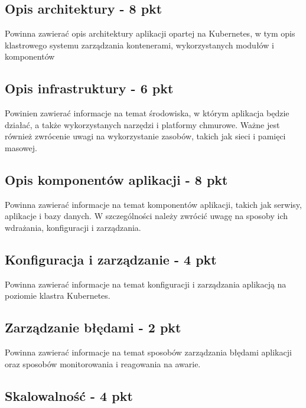 \documentclass[12pt,a4paper]{article}
\begin{document}
\subsection{Opis architektury - 8 pkt}
\label{sec:introduction}
Powinna zawierać opis architektury aplikacji opartej na Kubernetes, w tym opis klastrowego systemu zarządzania kontenerami, wykorzystanych modułów i komponentów


\subsection{Opis infrastruktury - 6 pkt}
\label{sec:Users}

Powinien zawierać informacje na temat środowiska, w którym aplikacja będzie działać, a także wykorzystanych narzędzi i platformy chmurowe. Ważne jest również zwrócenie uwagi na wykorzystanie zasobów, takich jak sieci i pamięci masowej.

\subsection{Opis komponentów aplikacji - 8 pkt}
\label{sec:FunctionalConditions}

Powinna zawierać informacje na temat komponentów aplikacji, takich jak serwisy, aplikacje i bazy danych. W szczególności należy zwrócić uwagę na sposoby ich wdrażania, konfiguracji i zarządzania.

\subsection{Konfiguracja i zarządzanie - 4 pkt}
\label{sec:NonFunctionalConditions}

Powinna zawierać informacje na temat konfiguracji i zarządzania aplikacją na poziomie klastra Kubernetes.

\subsection{Zarządzanie błędami - 2 pkt}
\label{sec:ERD} 

Powinna zawierać informacje na temat sposobów zarządzania błędami aplikacji oraz sposobów monitorowania i reagowania na awarie.


\subsection{Skalowalność - 4 pkt}
\label{sec:ExamplesSection}
\end{document}
